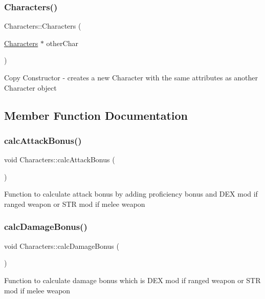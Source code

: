 \subsubsection{\texorpdfstring{Characters()}{Characters()}}
{\footnotesize\ttfamily Characters\+::\+Characters (\begin{DoxyParamCaption}\item[{\hyperlink{class_characters}{Characters} $\ast$}]{other\+Char }\end{DoxyParamCaption})}

Copy Constructor -\/ creates a new Character with the same attributes as another Character object 

\subsection{Member Function Documentation}
\hypertarget{class_characters_aafcca03cc72ce2b389c0412229864c6e}{}\label{class_characters_aafcca03cc72ce2b389c0412229864c6e} 
\subsubsection{\texorpdfstring{calc\+Attack\+Bonus()}{calcAttackBonus()}}
{\footnotesize\ttfamily void Characters\+::calc\+Attack\+Bonus (\begin{DoxyParamCaption}{ }\end{DoxyParamCaption})}

Function to calculate attack bonus by adding proficiency bonus and D\+EX mod if ranged weapon or S\+TR mod if melee weapon \hypertarget{class_characters_af750209704e0be8b911cbc29fc1362ee}{}\label{class_characters_af750209704e0be8b911cbc29fc1362ee} 
\subsubsection{\texorpdfstring{calc\+Damage\+Bonus()}{calcDamageBonus()}}
{\footnotesize\ttfamily void Characters\+::calc\+Damage\+Bonus (\begin{DoxyParamCaption}{ }\end{DoxyParamCaption})}

Function to calculate damage bonus which is D\+EX mod if ranged weapon or S\+TR mod if melee weapon \hypertarget{class_characters_ac5909582bf15fe17b7a6fa5104c26dd6}{}\label{class_characters_ac5909582bf15fe17b7a6fa5104c26dd6} 
